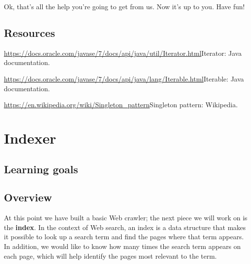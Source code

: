 \documentclass[12pt]{book}
\theoremstyle{exercise}
\newcommand{\java}{\verb}%}
\begin{document}
{Ok, that's all the help you're going to get from us. Now it's up to you.
Have fun!

\section{Resources}\label{resources-7}

\url{https://docs.oracle.com/javase/7/docs/api/java/util/Iterator.html}{Iterator}:
Java documentation.

\url{https://docs.oracle.com/javase/7/docs/api/java/lang/Iterable.html}{Iterable}:
Java documentation.

\url{https://en.wikipedia.org/wiki/Singleton_pattern}{Singleton
pattern}: Wikipedia. 

\chapter{Indexer}

\section{Learning goals}\label{learning-goals-1}


\section{Overview}\label{overview-9}

At this point we have built a basic Web crawler; the next piece we will
work on is the \textbf{index}. In the context of Web search, an index is
a data structure that makes it possible to look up a search term and
find the pages where that term appears. In addition, we would like to
know how many times the search term appears on each page, which will
help identify the pages most relevant to the term.

}
\end{document}
